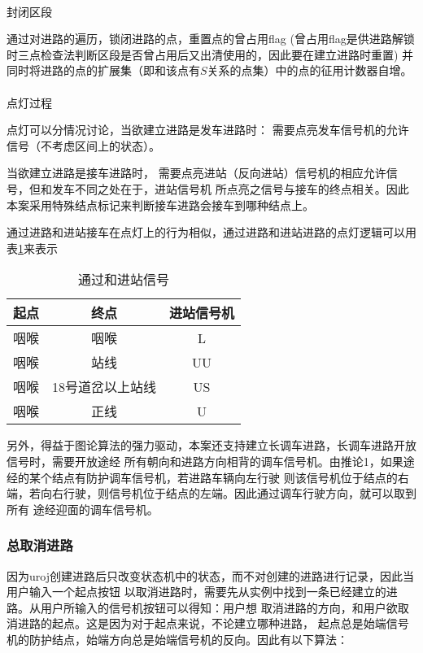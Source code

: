 \paragraph{}封闭区段

通过对进路的遍历，锁闭进路的点，重置点的曾占用flag
(曾占用flag是供进路解锁时三点检查法判断区段是否曾占用后又出清使用的，因此要在建立进路时重置)
并同时将进路的点的扩展集（即和该点有$S$关系的点集）中的点的征用计数器自增。

\paragraph{}点灯过程

点灯可以分情况讨论，当欲建立进路是发车进路时：
需要点亮发车信号机的允许信号（不考虑区间上的状态）。

当欲建立进路是接车进路时，
需要点亮进站（反向进站）信号机的相应允许信号，但和发车不同之处在于，进站信号机
所点亮之信号与接车的终点相关。因此本案采用特殊结点标记来判断接车进路会接车到哪种结点上。

通过进路和进站接车在点灯上的行为相似，通过进路和进站进路的点灯逻辑可以用表\ref{homw_light}来表示

\begin{table}[htpb!]
    \centering
    \caption{\label{homw_light}通过和进站信号}
    \begin{tabular}{ccc}
        \toprule
        起点 & 终点             & 进站信号机 \\
        \midrule
        咽喉 & 咽喉             & L          \\
        咽喉 & 站线             & UU         \\
        咽喉 & 18号道岔以上站线 & US         \\
        咽喉 & 正线             & U          \\
        \bottomrule
    \end{tabular}
\end{table}

另外，得益于图论算法的强力驱动，本案还支持建立长调车进路，长调车进路开放信号时，需要开放途经
所有朝向和进路方向相背的调车信号机。由推论1，如果途经的某个结点有防护调车信号机，若进路车辆向左行驶
则该信号机位于结点的右端，若向右行驶，则信号机位于结点的左端。因此通过调车行驶方向，就可以取到所有
途经迎面的调车信号机。

\subsubsection{总取消进路}
因为uroj创建进路后只改变状态机中的状态，而不对创建的进路进行记录，因此当用户输入一个起点按钮
以取消进路时，需要先从实例中找到一条已经建立的进路。从用户所输入的信号机按钮可以得知：用户想
取消进路的方向，和用户欲取消进路的起点。这是因为对于起点来说，不论建立哪种进路，
起点总是始端信号机的防护结点，始端方向总是始端信号机的反向。因此有以下算法：

